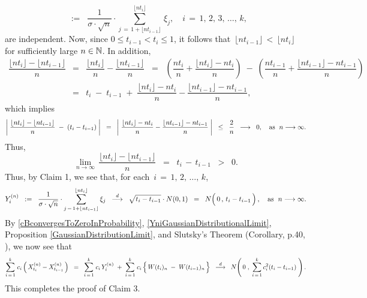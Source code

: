 \begin{enumerate}
\begin{equation*}
		\;\; := \;\;
		\dfrac{1}{\sigma\cdot\sqrt{n}}
		\cdot
		\overset{\lfloor nt_{i} \rfloor}{\underset{j\,=\,1+\lfloor nt_{i-1} \rfloor}{\sum}}\,\xi_{j},
		\quad
		i \,=\, 1,\, 2,\, 3,\, \ldots,\, k,
		\end{equation*}
		are independent.
		Now, since $0 \leq t_{i-1} < t_{i} \leq 1$, it follows that
		\,$\lfloor nt_{i-1} \rfloor \,<\, \lfloor nt_{i} \rfloor$\,
		for sufficiently large $n \in \mathbb{N}$.
		In addition,
		\begin{eqnarray*}
		\dfrac{\lfloor n t_{i} \rfloor - \lfloor n t_{i-1} \rfloor}{n}
		& = & \dfrac{\lfloor n t_{i} \rfloor}{n} - \dfrac{\lfloor n t_{i-1} \rfloor}{n}
		\;\; = \;\; \left(\dfrac{n t_{i}}{n} + \dfrac{\lfloor n t_{i} \rfloor - n t_{i}}{n}\right)
			\;-\; \left(\dfrac{n t_{i-1}}{n} + \dfrac{\lfloor n t_{i-1} \rfloor - n t_{i-1}}{n}\right)
		\\
		&=& t_{i} \;-\; t_{i-1} \;+\;  \dfrac{\lfloor nt_{i} \rfloor - nt_{i}}{n} - \dfrac{\lfloor nt_{i-1} \rfloor - nt_{i-1}}{n},
		\end{eqnarray*}
		which implies
		\begin{equation*}
		\left\vert\; \dfrac{\lfloor n t_{i} \rfloor - \lfloor n t_{i-1} \rfloor}{n} \;-\; (t_{i}-t_{i-1}) \;\right\vert
		\;\;=\;\;
		\left\vert\; \dfrac{\lfloor nt_{i} \rfloor - nt_{i}}{n} - \dfrac{\lfloor nt_{i-1} \rfloor - nt_{i-1}}{n} \;\right\vert
		\;\; \leq \;\;
		\dfrac{2}{n}
		\;\; \longrightarrow \;\; 0,
		\quad
		\textnormal{as \;$n \longrightarrow \infty$}.
		\end{equation*}
		Thus,
		\begin{equation*}
		\lim_{n\rightarrow\infty}\,\dfrac{\lfloor n t_{i} \rfloor - \lfloor n t_{i-1} \rfloor}{n} \;\;=\;\; t_{i} \,-\, t_{i-1} \;\;>\;\; 0.
		\end{equation*}
		Thus, by Claim 1, we see that, for each \,$i \,=\, 1,\, 2,\, \ldots,\, k$,
		\begin{equation}\label{YniGaussianDistributionalLimit}
		Y^{(n)}_{i}
		\;\; := \;\;
		\dfrac{1}{\sigma\cdot\sqrt{n}}
		\cdot
		\overset{\lfloor nt_{i} \rfloor}{\underset{j\,=\,1+\lfloor nt_{i-1} \rfloor}{\sum}}\,\xi_{j}
		\;\; \overset{d}{\longrightarrow} \;\; \sqrt{t_{i}-t_{i-1}} \cdot N(0,1)
		\;\; = \;\; N\!\left(\,\overset{{\color{white}.}}{0}\,,\,t_{i}-t_{i-1}\,\right),
		\quad
		\textnormal{as \;$n \longrightarrow \infty$}.
		\end{equation}
		By \eqref{cBconvergesToZeroInProbability},
		\eqref{YniGaussianDistributionalLimit},
		Proposition \ref{GaussianDistributionLimit},
		and Slutsky's Theorem (Corollary, p.40, \cite{Ferguson1996}), we now see that
		\begin{equation*}
		\overset{k}{\underset{i\,=\,1}{\sum}} \; c_{i}\left(\,X^{(n)}_{t_{i}} - X^{(n)}_{t_{i-1}}\,\right)
		\;\;=\;\;
		\overset{k}{\underset{i\,=\,1}{\sum}} \; c_{i}\,Y^{(n)}_{i}
		\;+\;
		\overset{k}{\underset{i\,=\,1}{\sum}} \; c_{i} \left\{\,\overset{{\color{white}.}}{W}(t_{i})_{n} \;-\; W(t_{i-1})_{n}\,\right\}
		\;\;\overset{d}{\longrightarrow}\;\;
		N\!\left(\,0\;,\;\sum_{i\,=\,1}^{k}c_{i}^{2}(t_{i}-t_{i-1})\;\right).
		\end{equation*}		
		This completes the proof of Claim 3.

\end{enumerate}

